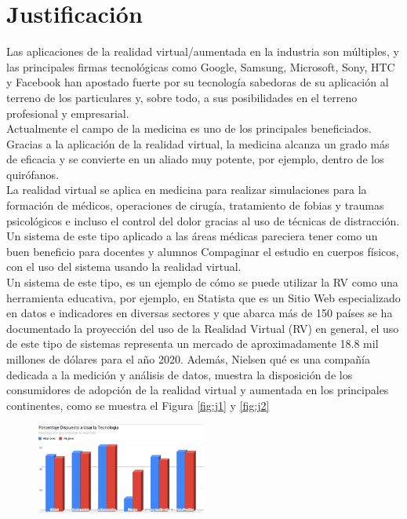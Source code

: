 \section{Justificación}
Las aplicaciones de la realidad virtual/aumentada en la industria son múltiples, y las principales firmas tecnológicas como Google, Samsung, Microsoft, 
Sony, HTC y Facebook han apostado fuerte por su tecnología sabedoras de su aplicación al terreno de los particulares y, sobre todo, a sus posibilidades 
en el terreno profesional y empresarial.\\
Actualmente el campo de la medicina es uno de los principales beneficiados. Gracias a la aplicación de la realidad virtual, la medicina alcanza un grado más de eficacia 
y se convierte en un aliado muy potente, por ejemplo, dentro de los quirófanos.\\
La realidad virtual se aplica en medicina para realizar simulaciones para la formación de médicos, operaciones de cirugía, tratamiento de fobias y traumas 
psicológicos e incluso el control del dolor gracias al uso de técnicas de distracción.\\
Un sistema de este tipo aplicado a las áreas médicas pareciera tener como un buen beneficio para docentes y alumnos Compaginar el estudio en cuerpos físicos, con 
el uso del sistema usando la realidad virtual\cite{norton1994integrating}.\\
Un sistema de este tipo, es un ejemplo de cómo se puede utilizar la RV como una herramienta educativa, por ejemplo,  en Statista\cite{web1} que es un Sitio Web especializado 
en datos e indicadores en diversas sectores y que abarca más de 150 países se ha documentado la proyección del uso de la Realidad Virtual (RV) en general, el 
uso de este tipo de sistemas  representa un mercado de aproximadamente 18.8 mil millones de dólares para el año 2020. Además, Nielsen\cite{web2} qué es una compañía dedicada 
a la medición y análisis de datos,  muestra la disposición de los consumidores de adopción de la realidad virtual y aumentada en los principales continentes, como se muestra el Figura \ref{fig:j1} y \ref{fig:j2}
\begin{figure}[H]
	\begin{center}
 		\includegraphics[width = 0.5\textwidth]{v3/images/chart2.png}
	\end{center} 
\end{figure}
